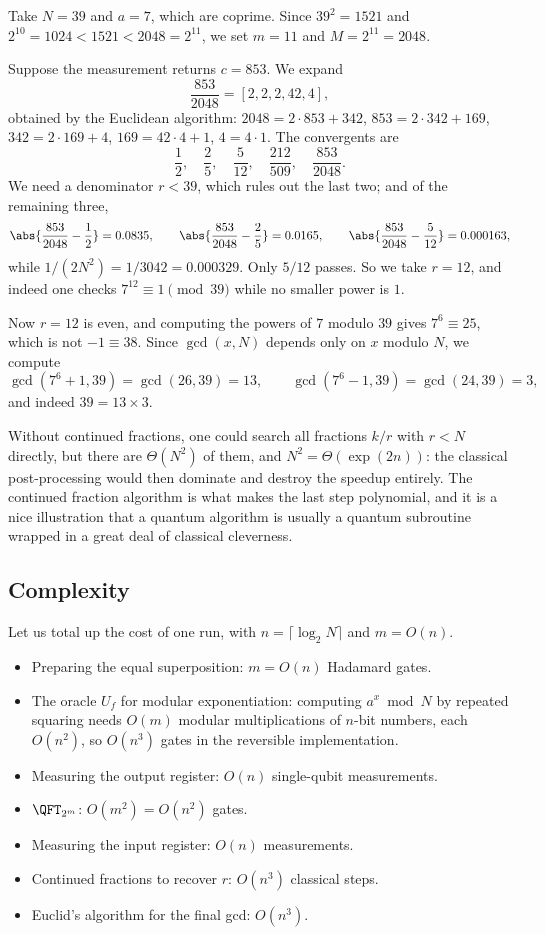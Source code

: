\begin{example}
	Take $N = 39$ and $a = 7$, which are coprime. Since $39^2 = 1521$ and $2^{10} = 1024 < 1521 < 2048 = 2^{11}$, we set $m = 11$ and $M = 2^{11} = 2048$.

	Suppose the measurement returns $c = 853$. We expand
	$$\frac{853}{2048} = [2,2,2,42,4],$$
	obtained by the Euclidean algorithm: $2048 = 2\cdot853+342$, $853 = 2\cdot342+169$, $342 = 2\cdot169+4$, $169 = 42\cdot4+1$, $4 = 4\cdot1$. The convergents are
	$$\frac12,\quad\frac25,\quad\frac5{12},\quad\frac{212}{509},\quad\frac{853}{2048}.$$
	We need a denominator $r<39$, which rules out the last two; and of the remaining three,
	$$\abs{\frac{853}{2048}-\frac12} = 0.0835,\qquad \abs{\frac{853}{2048}-\frac25}=0.0165,\qquad\abs{\frac{853}{2048}-\frac5{12}}=0.000163,$$
	while $1/(2N^2) = 1/3042 = 0.000329$. Only $5/12$ passes. So we take $r = 12$, and indeed one checks $7^{12}\equiv1\pmod{39}$ while no smaller power is $1$.

	Now $r = 12$ is even, and computing the powers of $7$ modulo $39$ gives $7^6 \equiv 25$, which is not $-1\equiv38$. Since $\gcd(x,N)$ depends only on $x$ modulo $N$, we compute
	$$\gcd\left(7^6+1, 39\right) = \gcd(26,39)=13, \qquad \gcd\left(7^6-1,39\right)=\gcd(24,39)=3,$$
	and indeed $39 = 13\times3$.
\end{example}

\begin{remark}
	Without continued fractions, one could search all fractions $k/r$ with $r<N$ directly, but there are $\Theta(N^2)$ of them, and $N^2 = \Theta(\exp(2n))$: the classical post-processing would then dominate and destroy the speedup entirely. The continued fraction algorithm is what makes the last step polynomial, and it is a nice illustration that a quantum algorithm is usually a quantum subroutine wrapped in a great deal of classical cleverness.
\end{remark}

\subsection{Complexity}

Let us total up the cost of one run, with $n = \lceil\log_2 N\rceil$ and $m = O(n)$.

\begin{itemize}
	\item Preparing the equal superposition: $m = O(n)$ Hadamard gates.
	\item The oracle $U_f$ for modular exponentiation: computing $a^x\bmod N$ by repeated squaring needs $O(m)$ modular multiplications of $n$-bit numbers, each $O(n^2)$, so $O(n^3)$ gates in the reversible implementation.
	\item Measuring the output register: $O(n)$ single-qubit measurements.
	\item $\QFT_{2^m}$: $O(m^2) = O(n^2)$ gates.
	\item Measuring the input register: $O(n)$ measurements.
	\item Continued fractions to recover $r$: $O(n^3)$ classical steps.
	\item Euclid's algorithm for the final gcd: $O(n^3)$.
\end{itemize}

